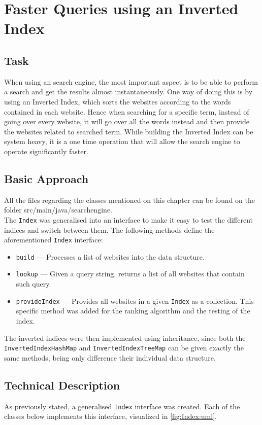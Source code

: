 \chapter{Faster Queries using an Inverted Index}

\section{Task}
When using an search engine, the most important aspect is to be able to perform a search and get the results almost instantaneously. One way of doing this is by using an Inverted Index, which sorts the websites according to the words contained in each website. Hence when searching for a specific term, instead of going over every website, it will go over all the words instead and then provide the websites related to searched term. While building the Inverted Index can be system heavy, it is a one time operation that will allow the search engine to operate significantly faster.

\section{Basic Approach}

All the files regarding the classes mentioned on this chapter can be found on the folder src/main/java/searchengine.\\
The {\tt Index} was generalised into an interface to make it easy to test the different indices and switch between them. The following methods define the aforementioned {\tt Index} interface:
\begin{itemize}
    \item {\tt build} — Processes a list of websites into the data structure.
    \item {\tt lookup} — Given a query string, returns a list of all websites that contain such query.
    \item {\tt provideIndex} — Provides all websites in a given {\tt Index} as a collection. This specific method was added for the ranking algorithm and the testing of the index.
\end{itemize}
The inverted indices were then implemented using inheritance, since both the {\tt InvertedIndexHashMap} and {\tt InvertedIndexTreeMap} can be given exactly the same methods, being only difference their individual data structure.

\section{Technical Description}
As previously stated, a generalised {\tt Index} interface was created. Each of the classes below implements this interface, visualized in \ref{fig:Index:uml}.


